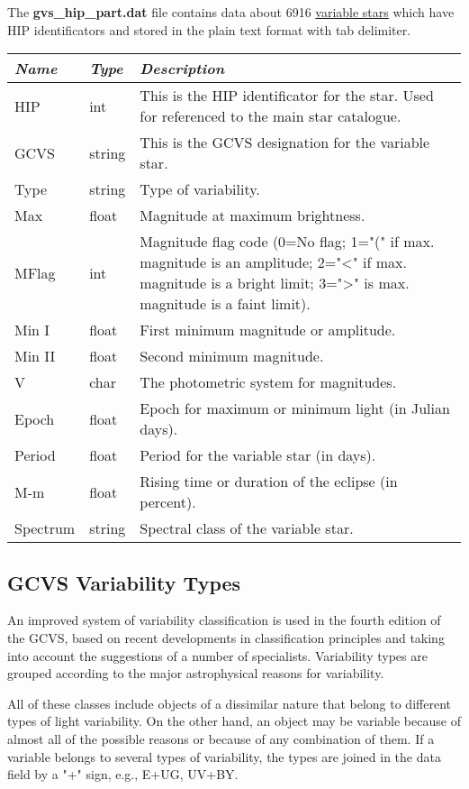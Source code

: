 The \textbf{gvs\_hip\_part.dat} file contains data about 6916
\href{Variable_Stars}{variable stars} which have HIP identificators and
stored in the plain text format with tab delimiter.

\begin{longtabu} to \textwidth {l|l|X}
\toprule
\emph{Name} & \emph{Type} & \emph{Description}\tabularnewline
\midrule
HIP & int & This is the HIP identificator for the star. Used for
referenced to the main star catalogue.\tabularnewline
\midrule
GCVS & string & This is the GCVS designation for the variable
star.\tabularnewline
\midrule
Type & string & Type of variability.\tabularnewline
\midrule
Max & float & Magnitude at maximum brightness.\tabularnewline
\midrule
MFlag & int & Magnitude flag code (0=No flag; 1="(" if max. magnitude is
an amplitude; 2="\textless{}" if max. magnitude is a bright limit;
3="\textgreater{}" is max. magnitude is a faint limit).\tabularnewline
\midrule
Min I & float & First minimum magnitude or amplitude.\tabularnewline
\midrule
Min II & float & Second minimum magnitude.\tabularnewline
\midrule
V & char & The photometric system for magnitudes.\tabularnewline
\midrule
Epoch & float & Epoch for maximum or minimum light (in Julian
days).\tabularnewline
\midrule
Period & float & Period for the variable star (in days).\tabularnewline
\midrule
M-m & float & Rising time or duration of the eclipse (in
percent).\tabularnewline
\midrule
Spectrum & string & Spectral class of the variable star.\tabularnewline
\bottomrule
\end{longtabu}

\subsection{GCVS Variability Types}\label{gcvs-variability-types}

An improved system of variability classification is used in the fourth
edition of the GCVS, based on recent developments in classification
principles and taking into account the suggestions of a number of
specialists. Variability types are grouped according to the major
astrophysical reasons for variability.

All of these classes include objects of a dissimilar nature that belong
to different types of light variability. On the other hand, an object
may be variable because of almost all of the possible reasons or because
of any combination of them. If a variable belongs to several types of
variability, the types are joined in the data field by a "+" sign, e.g.,
E+UG, UV+BY.

